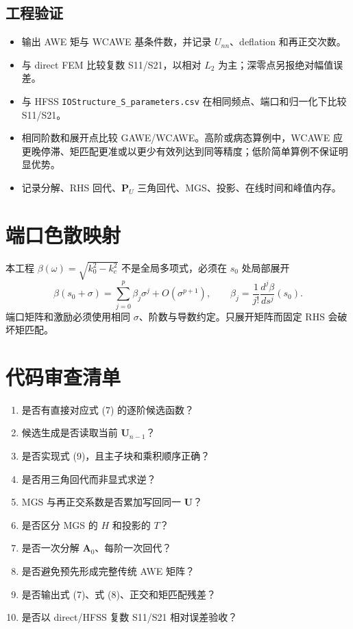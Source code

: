 \documentclass[11pt,a4paper]{ctexart}
\newcommand{\A}{\bm A}
\newcommand{\Umat}{\bm U}
\begin{document}
\subsection{工程验证}
\begin{itemize}
\item 输出 AWE 矩与 WCAWE 基条件数，并记录 $U_{nn}$、deflation 和再正交次数。
\item 与 direct FEM 比较复数 S11/S21，以相对 $L_2$ 为主；深零点另报绝对幅值误差。
\item 与 HFSS \texttt{IOStructure\_S\_parameters.csv} 在相同频点、端口和归一化下比较 S11/S21。
\item 相同阶数和展开点比较 GAWE/WCAWE。高阶或病态算例中，WCAWE 应更晚停滞、矩匹配更准或以更少有效列达到同等精度；低阶简单算例不保证明显优势。
\item 记录分解、RHS 回代、$\bm P_U$ 三角回代、MGS、投影、在线时间和峰值内存。
\end{itemize}

\section{端口色散映射}
本工程 $\beta(\omega)=\sqrt{k_0^2-k_c^2}$ 不是全局多项式，必须在 $s_0$ 处局部展开
\begin{equation}
\beta(s_0+\sigma)=\sum_{j=0}^{p}\beta_j\sigma^j+O(\sigma^{p+1}),\qquad
\beta_j=\frac{1}{j!}\frac{d^j\beta}{ds^j}(s_0).
\end{equation}
端口矩阵和激励必须使用相同 $\sigma$、阶数与导数约定。只展开矩阵而固定 RHS 会破坏矩匹配。

\section{代码审查清单}
\begin{enumerate}
\item 是否有直接对应式 (7) 的逐阶候选函数？
\item 候选生成是否读取当前 $\Umat_{n-1}$？
\item 是否实现式 (9)，且主子块和乘积顺序正确？
\item 是否用三角回代而非显式求逆？
\item MGS 与再正交系数是否累加写回同一 $\Umat$？
\item 是否区分 MGS 的 $H$ 和投影的 $T$？
\item 是否一次分解 $\A_0$、每阶一次回代？
\item 是否避免预先形成完整传统 AWE 矩阵？
\item 是否输出式 (7)、式 (8)、正交和矩匹配残差？
\item 是否以 direct/HFSS 复数 S11/S21 相对误差验收？
\end{enumerate}
\end{document}
